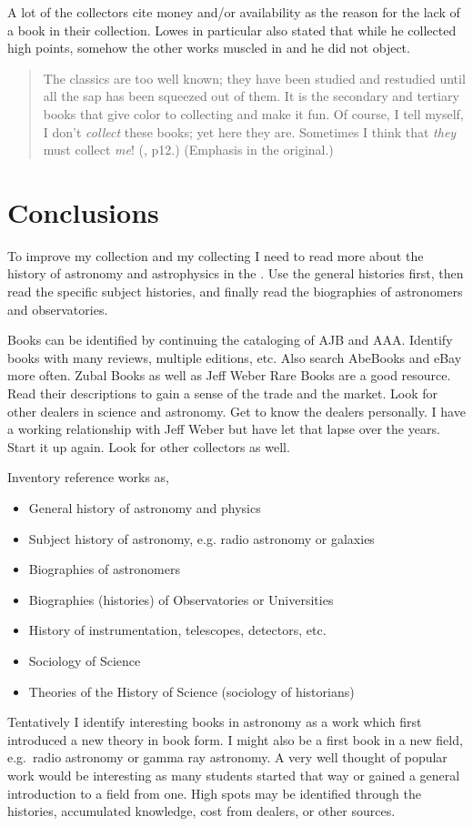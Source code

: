 \documentclass[letterpaper]{article}
\begin{document}
A lot of the collectors cite money and/or availability as the reason
for the lack of a book in their collection.  Lowes in particular also
stated that while he collected high points, somehow the other works
muscled in and he did not object.

\begin{quotation}
The classics are too well known; they have been studied and restudied
until all the sap has been squeezed out of them. It is the secondary
and tertiary books that give color to collecting and make it fun.  Of
course, I tell myself, I don't {\itshape collect} these books; yet
here they are. Sometimes I think that {\itshape they} must collect
{\itshape me}\thinspace! (\cite{Godine1970}, p12.) (Emphasis in the
original.)
\end{quotation}

\section{Conclusions}

To improve my collection and my collecting I need to read more about
the history of astronomy and astrophysics in the . Use the
general histories first, then read the specific subject histories, and
finally read the biographies of astronomers and observatories.

Books can be identified by continuing the cataloging of AJB and AAA.
Identify books with many reviews, multiple editions, etc.
Also search AbeBooks and eBay more often. Zubal Books as well as Jeff
Weber Rare Books are a good resource. Read their descriptions to gain a
sense of the trade and the market. Look for other dealers in
 science and astronomy. Get to know the dealers personally. I
have a working relationship with Jeff Weber but have let that lapse
over the years. Start it up again. Look for other collectors as well.


Inventory reference works as,
\begin{itemize}
\item General history of astronomy and physics
\item Subject history of astronomy, e.g. radio astronomy or galaxies
\item Biographies of astronomers
\item Biographies (histories) of Observatories or Universities
\item History of instrumentation, telescopes, detectors, etc.
\item Sociology of Science
\item Theories of the History of Science (sociology of historians)
\end{itemize}

Tentatively I identify interesting books in  astronomy as a
work which first introduced a new theory in book form. I might also be
a first book in a new field, e.g.\ radio astronomy or gamma ray
astronomy. A very well thought of popular work would be interesting as
many students started that way or gained a general introduction to a
field from one. High spots may be identified through
the histories, accumulated knowledge, cost from dealers, or other
sources.

\printbibliography
\end{document}

